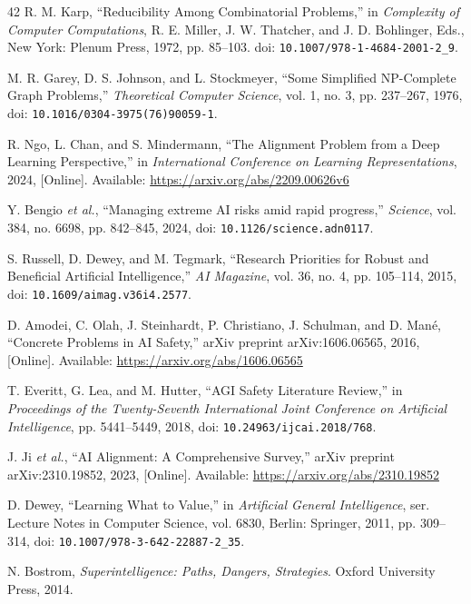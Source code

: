 \begin{thebibliography}{42}
R. M. Karp, ``Reducibility Among Combinatorial Problems,'' in \emph{Complexity of Computer Computations}, R. E. Miller, J. W. Thatcher, and J. D. Bohlinger, Eds., New York: Plenum Press, 1972, pp. 85--103. doi: \nolinkurl{10.1007/978-1-4684-2001-2_9}.

M. R. Garey, D. S. Johnson, and L. Stockmeyer, ``Some Simplified NP-Complete Graph Problems,'' \emph{Theoretical Computer Science}, vol. 1, no. 3, pp. 237--267, 1976, doi: \nolinkurl{10.1016/0304-3975(76)90059-1}.

R. Ngo, L. Chan, and S. Mindermann, ``The Alignment Problem from a Deep Learning Perspective,'' in \emph{International Conference on Learning Representations}, 2024, [Online]. Available: \url{https://arxiv.org/abs/2209.00626v6}

Y. Bengio \emph{et al.}, ``Managing extreme AI risks amid rapid progress,'' \emph{Science}, vol. 384, no. 6698, pp. 842--845, 2024, doi: \nolinkurl{10.1126/science.adn0117}.

S. Russell, D. Dewey, and M. Tegmark, ``Research Priorities for Robust and Beneficial Artificial Intelligence,'' \emph{AI Magazine}, vol. 36, no. 4, pp. 105--114, 2015, doi: \nolinkurl{10.1609/aimag.v36i4.2577}.

D. Amodei, C. Olah, J. Steinhardt, P. Christiano, J. Schulman, and D. Man\'{e}, ``Concrete Problems in AI Safety,'' arXiv preprint arXiv:1606.06565, 2016, [Online]. Available: \url{https://arxiv.org/abs/1606.06565}

T. Everitt, G. Lea, and M. Hutter, ``AGI Safety Literature Review,'' in \emph{Proceedings of the Twenty-Seventh International Joint Conference on Artificial Intelligence}, pp. 5441--5449, 2018, doi: \nolinkurl{10.24963/ijcai.2018/768}.

J. Ji \emph{et al.}, ``AI Alignment: A Comprehensive Survey,'' arXiv preprint arXiv:2310.19852, 2023, [Online]. Available: \url{https://arxiv.org/abs/2310.19852}

D. Dewey, ``Learning What to Value,'' in \emph{Artificial General Intelligence}, ser. Lecture Notes in Computer Science, vol. 6830, Berlin: Springer, 2011, pp. 309--314, doi: \nolinkurl{10.1007/978-3-642-22887-2_35}.

N. Bostrom, \emph{Superintelligence: Paths, Dangers, Strategies}. Oxford University Press, 2014.


\end{thebibliography}
